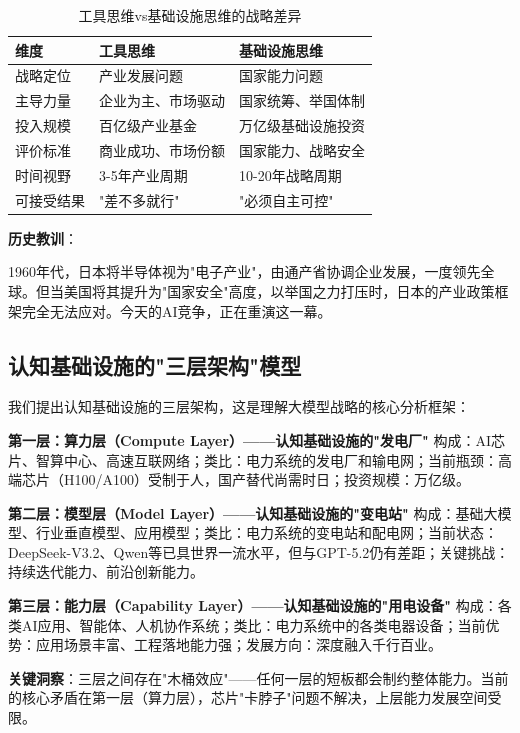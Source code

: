\begin{table}[H]
\centering
\caption{工具思维vs基础设施思维的战略差异}
\small
\begin{tabular}{p{2.5cm}p{5cm}p{5cm}}
\toprule
\textbf{维度} & \textbf{工具思维} & \textbf{基础设施思维} \\
\midrule
战略定位 & 产业发展问题 & 国家能力问题 \\
主导力量 & 企业为主、市场驱动 & 国家统筹、举国体制 \\
投入规模 & 百亿级产业基金 & 万亿级基础设施投资 \\
评价标准 & 商业成功、市场份额 & 国家能力、战略安全 \\
时间视野 & 3-5年产业周期 & 10-20年战略周期 \\
可接受结果 & "差不多就行" & "必须自主可控" \\
\bottomrule
\end{tabular}
\end{table}

\textbf{历史教训}：

1960年代，日本将半导体视为"电子产业"，由通产省协调企业发展，一度领先全球。但当美国将其提升为"国家安全"高度，以举国之力打压时，日本的产业政策框架完全无法应对。今天的AI竞争，正在重演这一幕。

\subsection{认知基础设施的"三层架构"模型}

我们提出认知基础设施的三层架构，这是理解大模型战略的核心分析框架：

\textbf{第一层：算力层（Compute Layer）——认知基础设施的"发电厂"}
构成：AI芯片、智算中心、高速互联网络；类比：电力系统的发电厂和输电网；当前瓶颈：高端芯片（H100/A100）受制于人，国产替代尚需时日；投资规模：万亿级。

\textbf{第二层：模型层（Model Layer）——认知基础设施的"变电站"}
构成：基础大模型、行业垂直模型、应用模型；类比：电力系统的变电站和配电网；当前状态：DeepSeek-V3.2、Qwen等已具世界一流水平，但与GPT-5.2仍有差距；关键挑战：持续迭代能力、前沿创新能力。

\textbf{第三层：能力层（Capability Layer）——认知基础设施的"用电设备"}
构成：各类AI应用、智能体、人机协作系统；类比：电力系统中的各类电器设备；当前优势：应用场景丰富、工程落地能力强；发展方向：深度融入千行百业。

\textbf{关键洞察}：三层之间存在"木桶效应"——任何一层的短板都会制约整体能力。当前的核心矛盾在第一层（算力层），芯片"卡脖子"问题不解决，上层能力发展空间受限。

